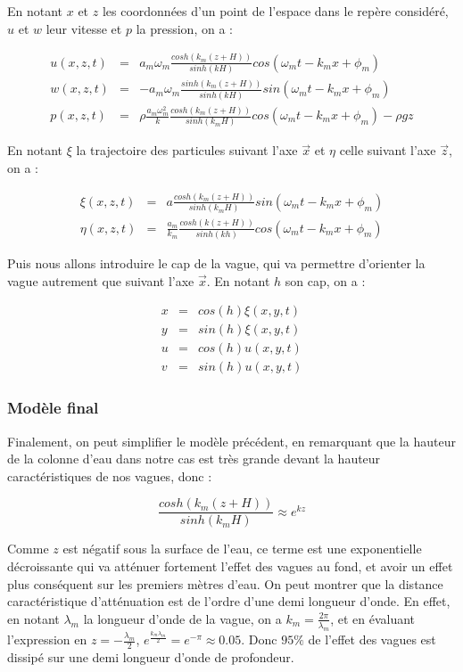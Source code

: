 				En notant $x$ et $z$ les coordonnées d'un point de l'espace dans le repère considéré, $u$ et $w$ leur vitesse et $p$ la pression, on a :

				\begin{eqnarray}
					u(x, z, t) & = & a_m \omega_m \frac{cosh(k_m(z+H))}{sinh(kH)} cos(\omega_m t -k_mx + \phi_m) \\
					w(x, z, t) & = & -a_m \omega_m \frac{sinh(k_m(z+H))}{sinh(kH)} sin(\omega_m t -k_mx + \phi_m) \\
					p(x, z, t) & = & \rho\frac{a_m\omega_m^2}{k} \frac{cosh(k_m(z+H))}{sinh(k_mH)} cos(\omega_m t -k_mx + \phi_m) - \rho g z
				\end{eqnarray}

				En notant $\xi$ la trajectoire des particules suivant l'axe $\overrightarrow{x}$ et $\eta$ celle suivant l'axe $\overrightarrow{z}$, on a :

				\begin{eqnarray}
					\xi(x, z, t) & = & a \frac{cosh(k_m(z+H))}{sinh(k_mH)} sin(\omega_m t -k_mx + \phi_m) \\
					\eta(x, z, t) & = & \frac{a_m}{k_m} \frac{cosh(k(z+H))}{sinh(kh)} cos(\omega_m t -k_mx + \phi_m)
				\end{eqnarray}

				Puis nous allons introduire le cap de la vague, qui va permettre d'orienter la vague autrement que suivant l'axe $\overrightarrow{x}$. En notant $h$ son cap, on a :

				\begin{eqnarray}
					x & = & cos(h) \xi(x, y, t) \\
					y & = & sin(h) \xi(x, y, t) \\
					u & = & cos(h) u(x, y, t) \\
					v & = & sin(h) u(x, y, t)
				\end{eqnarray}

			\subsubsection{Modèle final}
			
				Finalement, on peut simplifier le modèle précédent, en remarquant que la hauteur de la colonne d'eau dans notre cas est très grande devant la hauteur caractéristiques de nos vagues, donc :

				$$\frac{cosh(k_m(z+H))}{sinh(k_mH)} \approx e^{kz}$$

				Comme $z$ est négatif sous la surface de l'eau, ce terme est une exponentielle décroissante qui va atténuer fortement l'effet des vagues au fond, et avoir un effet plus conséquent sur les premiers mètres d'eau. On peut montrer que la distance caractéristique d'atténuation est de l'ordre d'une demi longueur d'onde. En effet, en notant $\lambda_m$ la longueur d'onde de la vague, on a $k_m = \tfrac{2\pi}{\lambda_m}$, et en évaluant l'expression en $z = - \tfrac{\lambda_m}{2}$, $e^{\tfrac{k_m\lambda_m}{2}} = e^{-\pi} \approx 0.05$. Donc $95 \%$ de l'effet des vagues est dissipé sur une demi longueur d'onde de profondeur.

